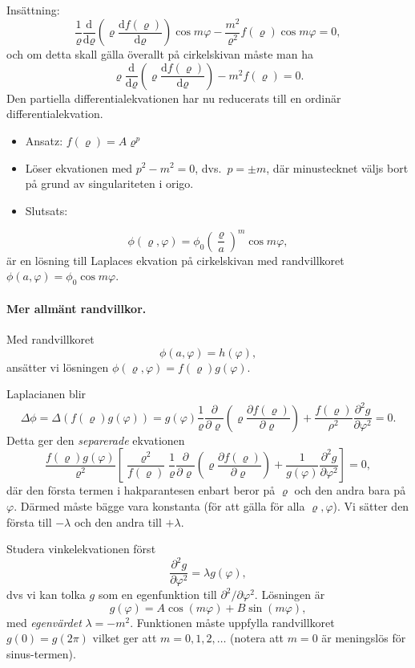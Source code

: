 \documentclass[%
oneside,                 %
final,                   %
10pt]{article}
\begin{document}
Insättning:
$$
\frac{1}{\varrho} \frac{\mbox{d}}{\mbox{d}\varrho} \left( \varrho \frac{\mbox{d}f(\varrho)}{\mbox{d}\varrho} \right) \cos m \varphi - \frac{m^2}{\varrho^2}f(\varrho)\cos m\varphi=0,
$$
och om detta skall gälla överallt på cirkelskivan måste man ha
$$
\varrho \frac{\mbox{d}}{\mbox{d}\varrho} \left(\varrho \frac{\mbox{d}f(\varrho)}{\mbox{d}\varrho} \right)
-m^2f(\varrho)=0.
$$
Den partiella differentialekvationen har nu reducerats till en ordinär differentialekvation.

\begin{itemize}
\item Ansatz: $f(\varrho)=A\varrho^p$ 

\item Löser ekvationen med $p^2-m^2=0$, dvs.~$p=\pm m$, där minustecknet väljs bort på grund av singulariteten i origo. 

\item Slutsats:
\end{itemize}

\noindent
$$
\phi(\varrho,\varphi)=\phi_0\left( \frac{\varrho}{a}\right)^m \cos m\varphi,
$$
är en lösning till Laplaces ekvation på cirkelskivan med randvillkoret $\phi(a,\varphi)=\phi_0\cos m\varphi$.

\paragraph{Mer allmänt randvillkor.}
Med randvillkoret
$$
\phi(a,\varphi)=h(\varphi),
$$
ansätter vi lösningen $\phi(\varrho,\varphi) = f(\varrho) g(\varphi)$.

Laplacianen blir
$$
\Delta \phi = \Delta \left( f(\varrho) g(\varphi) \right) = g(\varphi) \frac{1}{\varrho} \frac{\partial}{\partial\varrho} \left( \varrho \frac{\partial f(\varrho)}{\partial\varrho} \right) + \frac{f(\varrho)}{\rho^2} \frac{\partial^2 g}{\partial\varphi^2} = 0.
$$
Detta ger den \emph{separerade} ekvationen
$$
\frac{f(\varrho) g(\varphi)}{\varrho^2} \left[ \frac{\varrho^2}{f(\varrho)} \frac{1}{\varrho} \frac{\partial}{\partial\varrho} \left( \varrho \frac{\partial f(\varrho)}{\partial\varrho} \right) + \frac{1}{g(\varphi)} \frac{\partial^2 g}{\partial\varphi^2} \right] = 0,
$$
där den första termen i hakparantesen enbart beror på $\varrho$ och den andra bara på $\varphi$. Därmed måste bägge vara konstanta (för att gälla för alla $\varrho,\varphi$). Vi sätter den första till $-\lambda$ och den andra till $+\lambda$.

Studera vinkelekvationen först
$$
\frac{\partial^2 g}{\partial\varphi^2} = \lambda g(\varphi),
$$
dvs vi kan tolka $g$ som en egenfunktion till $\partial^2 / \partial\varphi^2$. Lösningen är
$$
g(\varphi) = A \cos (m \varphi) + B \sin (m \varphi),
$$
med \emph{egenvärdet} $\lambda = -m^2$. Funktionen måste uppfylla randvillkoret $g(0) = g(2\pi)$ vilket ger att $m = 0,1,2,\ldots$ (notera att $m=0$ är meningslös för sinus-termen).
\end{document}
